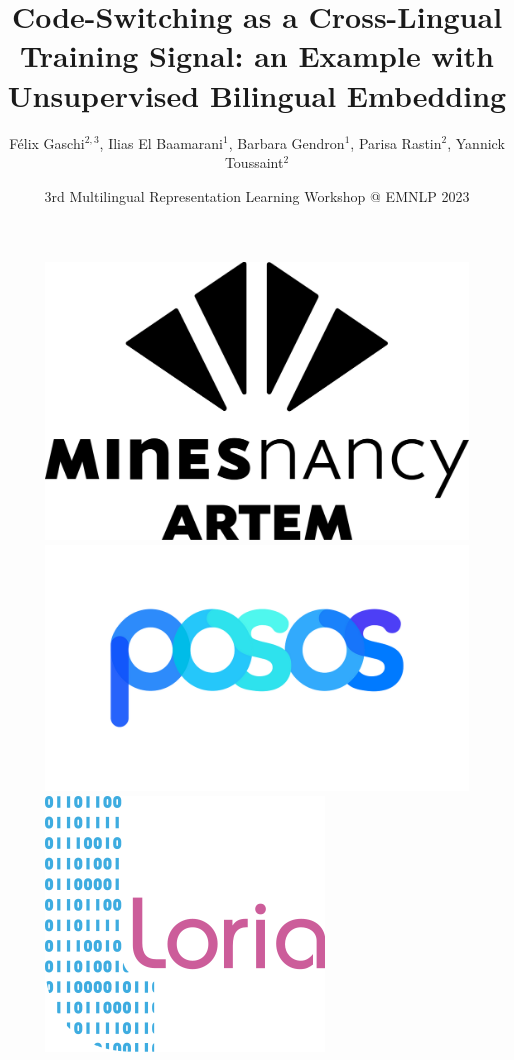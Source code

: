 \documentclass[english]{beamer}
\title[Code-Switching as a Cross-Lingual Training Signal]{Code-Switching as a Cross-Lingual Training Signal: an Example with Unsupervised Bilingual Embedding}
\author[Gaschi et al., 2023 (Mines Nancy - LORIA - POSOS)]{\small Félix Gaschi$^{2,3}$, Ilias El Baamarani$^1$, Barbara Gendron$^1$, Parisa Rastin$^2$, Yannick Toussaint$^2$}
\date{3rd Multilingual Representation Learning Workshop @ EMNLP 2023}
\institute[Mines Nancy - LORIA - POSOS]{\scriptsize $^1$École des Mines de Nancy, $^2$LORIA, $^3$SAS Posos}
\begin{document}
\begin{frame}
	\begin{figure} 
	\hspace*{0.5cm}
	\begin{minipage}[c]{.20\linewidth} 
	\includegraphics[scale=0.04]{Logo_Mines_Nancy.png} 
	\end{minipage} \hfill 
	\begin{minipage}[c]{.40\linewidth} 
	\includegraphics[scale=0.06]{posos.png} 
	\end{minipage} 
    \begin{minipage}[c]{.20\linewidth} 
        \includegraphics[scale=0.15]{loria.png} 
    \end{minipage} 
	\end{figure}
	\titlepage
	
\end{frame}
\end{document}
